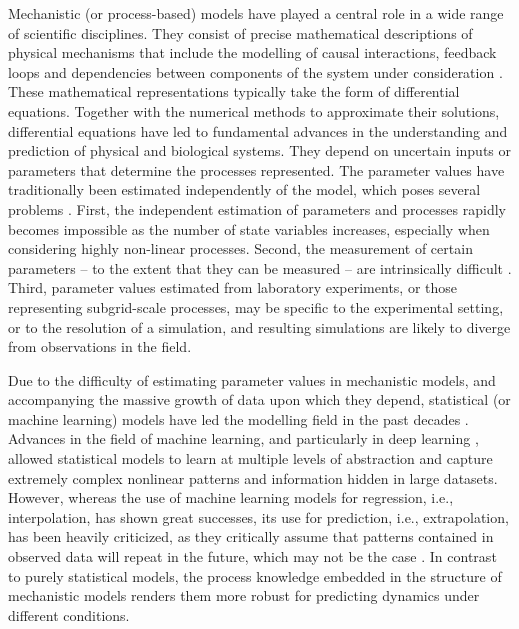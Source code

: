 
Mechanistic (or process-based) models have played a central role in a wide range of scientific disciplines. 
They consist of precise mathematical descriptions of physical mechanisms that include the modelling of causal interactions, feedback loops and dependencies between components of the system under consideration \cite{rackauckas2020universal}. 
These mathematical representations typically take the form of differential equations. 
Together with the numerical methods to approximate their solutions, differential equations have led to fundamental advances in the understanding and prediction of physical and biological systems.
They depend on uncertain inputs or parameters that determine the processes represented. 
The parameter values have traditionally been estimated independently of the model, which poses several problems \cite{hartig2012}.
First, the independent estimation of parameters and processes rapidly becomes impossible as the number of state variables increases, especially when considering highly non-linear processes. 
Second, the measurement of certain parameters -- to the extent that they can be measured -- are intrinsically difficult \cite{Schartau2017}. 
Third, parameter values estimated from laboratory experiments, or those representing subgrid-scale processes, may be specific to the experimental setting, or to the resolution of a simulation, and resulting simulations are likely to diverge from observations in the field.

Due to the difficulty of estimating parameter values in mechanistic models, and accompanying the massive growth of data upon which they depend, statistical (or machine learning) models have led the modelling field in the past decades \cite{Cox:2017hv}. 
Advances in the field of machine learning, and particularly in deep learning \cite{LeCun2015}, allowed statistical models to learn at multiple levels of abstraction and capture extremely complex nonlinear patterns and information hidden in large datasets. 
However, whereas the use of machine learning models for regression, i.e., interpolation, has shown great successes, its use for prediction, i.e., extrapolation, has been heavily criticized, as they critically assume that patterns contained in observed data will repeat in the future, which may not be the case \cite{dormann2007,Barnosky2012}. 
In contrast to purely statistical models, the process knowledge embedded in the structure of mechanistic models renders them more robust for predicting dynamics under different conditions.

